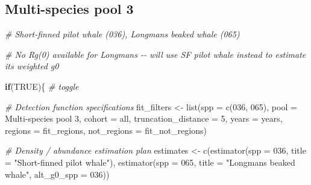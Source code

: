 \documentclass[
]{book}
\newenvironment{Shaded}{\begin{snugshade}}{\end{snugshade}}
\newcommand{\AttributeTok}[1]{\textcolor[rgb]{0.77,0.63,0.00}{#1}}
\newcommand{\CommentTok}[1]{\textcolor[rgb]{0.56,0.35,0.01}{\textit{#1}}}
\newcommand{\ConstantTok}[1]{\textcolor[rgb]{0.00,0.00,0.00}{#1}}
\newcommand{\ControlFlowTok}[1]{\textcolor[rgb]{0.13,0.29,0.53}{\textbf{#1}}}
\newcommand{\DecValTok}[1]{\textcolor[rgb]{0.00,0.00,0.81}{#1}}
\newcommand{\FunctionTok}[1]{\textcolor[rgb]{0.00,0.00,0.00}{#1}}
\newcommand{\NormalTok}[1]{#1}
\newcommand{\OtherTok}[1]{\textcolor[rgb]{0.56,0.35,0.01}{#1}}
\newcommand{\StringTok}[1]{\textcolor[rgb]{0.31,0.60,0.02}{#1}}
\begin{document}
\hypertarget{multi-species-pool-3}{%
\subsection*{Multi-species pool 3}\label{multi-species-pool-3}}

\begin{Shaded}
\begin{Highlighting}[]
\CommentTok{\# Short{-}finned pilot whale (036), Longman\textquotesingle{}s beaked whale (065)}

\CommentTok{\# No Rg(0) available for Longman\textquotesingle{}s {-}{-} will use SF pilot whale instead to estimate its weighted g0}

\ControlFlowTok{if}\NormalTok{(}\ConstantTok{TRUE}\NormalTok{)\{ }\CommentTok{\# toggle}

  \CommentTok{\# Detection function specifications}
\NormalTok{  fit\_filters }\OtherTok{\textless{}{-}}
    \FunctionTok{list}\NormalTok{(}\AttributeTok{spp =} \FunctionTok{c}\NormalTok{(}\StringTok{\textquotesingle{}036\textquotesingle{}}\NormalTok{, }\StringTok{\textquotesingle{}065\textquotesingle{}}\NormalTok{),}
         \AttributeTok{pool =} \StringTok{\textquotesingle{}Multi{-}species pool 3\textquotesingle{}}\NormalTok{,}
         \AttributeTok{cohort =} \StringTok{\textquotesingle{}all\textquotesingle{}}\NormalTok{,}
         \AttributeTok{truncation\_distance =} \DecValTok{5}\NormalTok{,}
         \AttributeTok{years =}\NormalTok{ years,}
         \AttributeTok{regions =}\NormalTok{ fit\_regions,}
         \AttributeTok{not\_regions =}\NormalTok{ fit\_not\_regions)}

  \CommentTok{\# Density / abundance estimation plan}
\NormalTok{  estimates }\OtherTok{\textless{}{-}}
    \FunctionTok{c}\NormalTok{(}\FunctionTok{estimator}\NormalTok{(}\AttributeTok{spp =} \StringTok{\textquotesingle{}036\textquotesingle{}}\NormalTok{, }\AttributeTok{title =} \StringTok{"Short{-}finned pilot whale"}\NormalTok{),}
      \FunctionTok{estimator}\NormalTok{(}\AttributeTok{spp =} \StringTok{\textquotesingle{}065\textquotesingle{}}\NormalTok{, }\AttributeTok{title =} \StringTok{"Longman\textquotesingle{}s beaked whale"}\NormalTok{, }
                \AttributeTok{alt\_g0\_spp =} \StringTok{\textquotesingle{}036\textquotesingle{}}\NormalTok{))}


\end{Highlighting}
\end{Shaded}
\end{document}
